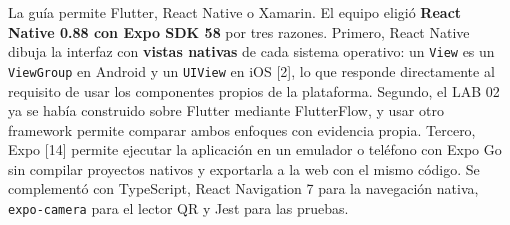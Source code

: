 \vspace{0.2cm}

La guía permite Flutter, React Native o Xamarin. El equipo eligió \textbf{React Native 0.88 con Expo SDK 58} por tres razones. Primero, React Native dibuja la interfaz con \textbf{vistas nativas} de cada sistema operativo: un \texttt{View} es un \texttt{View\allowbreak{}Group} en Android y un \texttt{UIView} en iOS [2], lo que responde directamente al requisito de usar los componentes propios de la plataforma. Segundo, el LAB 02 ya se había construido sobre Flutter mediante FlutterFlow, y usar otro framework permite comparar ambos enfoques con evidencia propia. Tercero, Expo [14] permite ejecutar la aplicación en un emulador o teléfono con Expo Go sin compilar proyectos nativos y exportarla a la web con el mismo código. Se complementó con TypeScript, React Navigation 7 para la navegación nativa, \texttt{expo-camera} para el lector QR y Jest para las pruebas.

